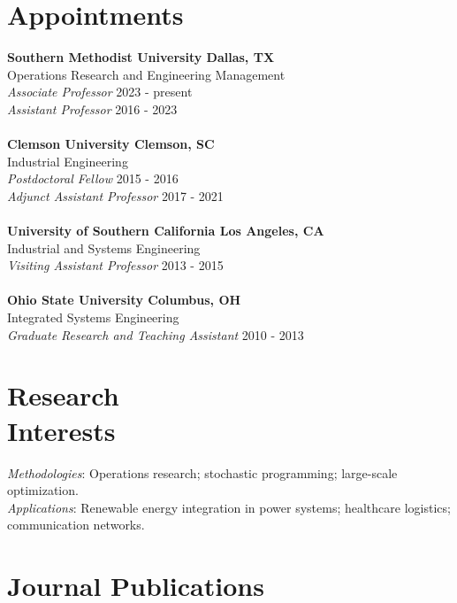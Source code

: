 \documentclass[hyperref, margin]{myResume}
\begin{document}
\begin{resume}
\section{Appointments}
\textbf{Southern Methodist University \hfill Dallas, TX} \\
Operations Research and Engineering Management\\
\textit{Associate Professor} \hfill 2023 - present\\
\textit{Assistant Professor} \hfill 2016 - 2023\\
\\
\textbf{Clemson University \hfill Clemson, SC} \\
Industrial Engineering \\
\textit{Postdoctoral Fellow} \hfill 2015 - 2016 \\
\textit{Adjunct Assistant Professor} \hfill 2017 - 2021 \\
\\
\textbf{University of Southern California \hfill Los Angeles, CA} \\
Industrial and Systems Engineering \\
\textit{Visiting Assistant Professor} \hfill 2013 - 2015 \\
\\
\textbf{Ohio State University \hfill Columbus, OH} \\
Integrated Systems Engineering \\
\textit{Graduate Research and Teaching Assistant} \hfill 2010 - 2013 \\

\section{Research \\Interests}
	\textit{Methodologies}: Operations research; stochastic programming; large-scale optimization. \\
	\textit{Applications}: Renewable energy integration in power systems; healthcare logistics; communication networks.


\section{Journal Publications}


\end{resume}
\end{document}
